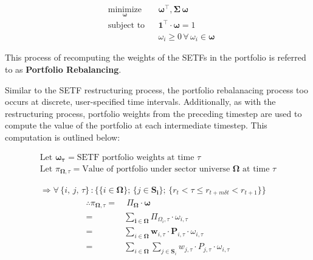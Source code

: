 \documentclass[../main.tex]{subfiles}
\begin{document}
\begin{equation*}
    \begin{aligned}
        & \underset{\boldsymbol{\omega}}{\text{minimize}} & & \boldsymbol{\omega}^\intercal, \boldsymbol{\Sigma} \, \boldsymbol{\omega} \\
        & \text{subject to}
        & & \boldsymbol{1}^\intercal \cdot \boldsymbol{\omega} = 1 \\
        & & & \omega_i \geq 0 \, \forall \,\omega_i \in \boldsymbol{\omega}
    \end{aligned}
\end{equation*}

This process of recomputing the weights of the SETFs in the portfolio is referred to as \textbf{Portfolio Rebalancing}.

Similar to the SETF restructuring process, the portfolio rebalanacing process too occurs at discrete, user-specified time intervals. Additionally, as with the restructuring process, portfolio weights from the preceding timestep are used to compute the value of the portfolio at each intermediate timestep. This computation is outlined below:

\begin{gather*}
    \text{Let $\boldsymbol{\omega_{\tau}}$} = \text{SETF portfolio weights at time $\tau$} \\
    \text{Let $\pi_{\boldsymbol{\Omega},\tau}$} = \text{Value of portfolio under sector universe $\boldsymbol{\Omega}$ at time $\tau$} \\
    \\
    \\
    \Rightarrow \forall \, \{ i, \, j, \, \tau \} \, : \{ \{ i \in \boldsymbol{\Omega} \}; \, \{ j \in \boldsymbol{S_i} \}; \, \{ r_{t} < \tau \leq r_{t+m\delta t} < r_{t + 1} \} \}
\end{gather*}
\begin{align*}
    \therefore \pi_{\boldsymbol{\Omega}, \tau} 
    =& \; \Pi_{\boldsymbol{\Omega}} \cdot \boldsymbol{\omega} \\
    =& \sum_{\boldsymbol{i \in \Omega}} \Pi_{\Omega_i, \tau} \cdot \omega_{i, \tau} \\
    =& \sum_{i \in \boldsymbol{\Omega}} \boldsymbol{w}_{i, \tau} \cdot \boldsymbol{P}_{i, \tau} \cdot \omega_{i, \tau} \\
    =& \sum_{i \in \boldsymbol{\Omega}} \sum_{j \in \boldsymbol{S}_i} w_{j, \tau} \cdot P_{j, \tau} \cdot \omega_{i, \tau}
\end{align*}
\end{document}
